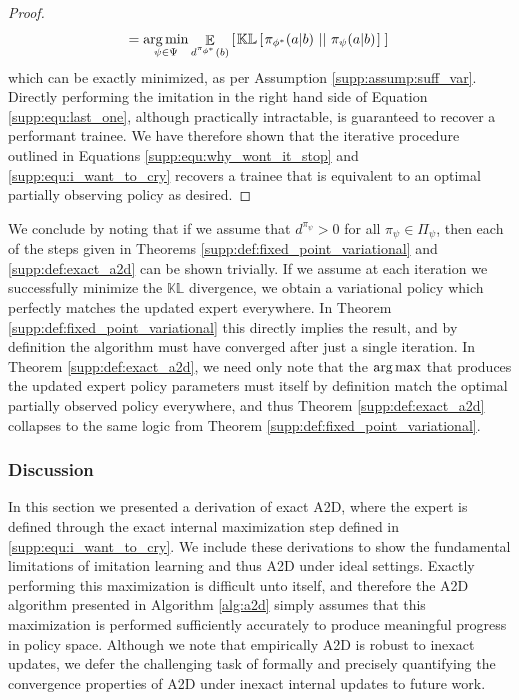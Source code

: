 \begin{proof}
\begin{align}
    = \mathop{\operatorname{arg\,min}}_{\psi \in \Psi} \mathop{\mathbb{E}}_{d^{\pi_{\phi^*}}(b)}  \left[ \hspace*{0.1em}{}  \mathbb{KL} \left[ \hspace*{0.1em}{}  \pi_{\phi^*}(a|b) \ ||\ {} \pi_{\psi}(a|b)  \hspace*{0.1em} \right]{}  \hspace*{0.1em} \right]{} \label{supp:equ:last_one}
\end{align}
which can be exactly minimized, as per Assumption \ref{supp:assump:suff_var}.  Directly performing the imitation in the right hand side of Equation \eqref{supp:equ:last_one}, although practically intractable, is guaranteed to recover a performant trainee.  We have therefore shown that the iterative procedure outlined in Equations \eqref{supp:equ:why_wont_it_stop} and \eqref{supp:equ:i_want_to_cry} recovers a trainee that is equivalent to an optimal partially observing policy as desired.  
\end{proof}

We conclude by noting that if we assume that $d^{\pi_{\psi}} > 0$ for all $\pi_{\psi} \in \Pi_{\psi}$, then each of the steps given in Theorems \ref{supp:def:fixed_point_variational} and \ref{supp:def:exact_a2d} can be shown trivially. If we assume at each iteration we successfully minimize the $\mathbb{KL}$ divergence, we obtain a variational policy which perfectly matches the updated expert everywhere.  In Theorem \ref{supp:def:fixed_point_variational} this directly implies the result, and by definition the algorithm must have converged after just a single iteration. In Theorem \ref{supp:def:exact_a2d}, we need only note that the $\operatorname{arg\,max}$ that produces the updated expert policy parameters must itself by definition match the optimal partially observed policy everywhere, and thus Theorem \ref{supp:def:exact_a2d} collapses to the same logic from Theorem \ref{supp:def:fixed_point_variational}. 



\subsubsection{Discussion}
In this section we presented a derivation of exact A2D, where the expert is defined through the exact internal maximization step defined in \eqref{supp:equ:i_want_to_cry}.  We include these derivations to show the fundamental limitations of imitation learning and thus A2D under ideal settings.  Exactly performing this maximization is difficult unto itself, and therefore the A2D algorithm presented in Algorithm \ref{alg:a2d} simply assumes that this maximization is performed sufficiently accurately to produce meaningful progress in policy space.  Although we note that empirically A2D is robust to inexact updates, we defer the challenging task of formally and precisely quantifying the convergence properties of A2D under inexact internal updates to future work.  



